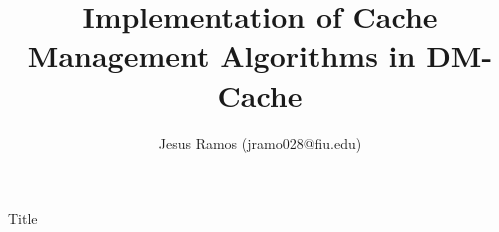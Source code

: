 \documentclass[final]{beamer}
\title{Implementation of Cache Management Algorithms in DM-Cache}
\author{Jesus Ramos (jramo028@fiu.edu)}
\institute[FIU]{Florida International University}
\date{}
\begin{document}
\begin{frame}{}

  \begin{block}{\large Title}

  \end{block}

\end{frame}
\end{document}
